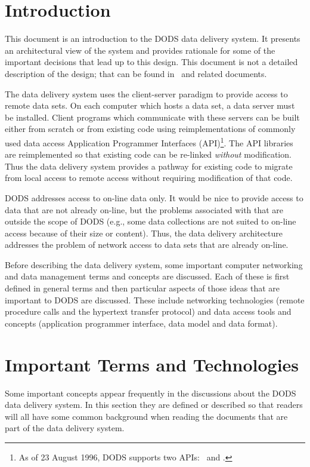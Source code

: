 \clearpage

\section{Introduction}

This document is an introduction to the DODS data delivery system. It
presents an architectural view of the system and provides rationale for some
of the important decisions that lead up to this design. This document is not
a detailed description of the design; that can be found in \DDD\ and related
documents.

The data delivery system uses the client-server paradigm to provide access to
remote data sets. On each computer which hosts a data set, a data server must
be installed. Client programs which communicate with these servers can be
built either from scratch or from existing code using reimplementations of
commonly used data access Application Programmer Interfaces (API)\footnote{As
of 23 August 1996, %
DODS supports two APIs: \netcdf\ and \jgofs.}. The API libraries
are reimplemented so that existing code can be re-linked {\em without\/}
modification. Thus the data delivery system provides a pathway for existing
code to migrate from local access to remote access without requiring
modification of that code.

DODS addresses access to on-line data only. It would be nice to provide
access to data that are not already on-line, but the problems associated with
that are outside the scope of DODS (e.g., some data collections are not
suited to on-line access because of their size or content). Thus, the data
delivery architecture addresses the problem of network access to data sets
that are already on-line.

Before describing the data delivery system, some important computer
networking and data management terms and concepts are discussed. Each of
these is first defined in general terms and then particular aspects of those
ideas that are important to DODS are discussed. These include networking
technologies (remote procedure calls and the hypertext transfer protocol) and
data access tools and concepts (application programmer interface, data model
and data format).

\section{Important Terms and Technologies}

Some important concepts appear frequently in the discussions about the DODS
data delivery system. In this section they are defined or described so that
readers will all have some common background when reading the documents that
are part of the data delivery system.

